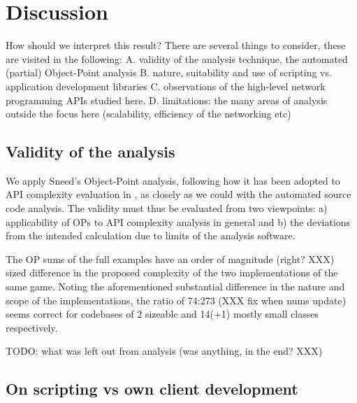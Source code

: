 \documentclass[conference]{IEEEtran}
\begin{document}
\section{Discussion%
  \label{discussion}%
}

How should we interpret this result? There are several things to
consider, these are visited in the following: A. validity of the
analysis technique, the automated (partial) Object-Point
analysis B. nature, suitability and use of scripting vs. application
development libraries C. observations of the high-level network
programming APIs studied here. D. limitations: the many areas of
analysis outside the focus here (scalability, efficiency of the
networking etc)


\subsection{Validity of the analysis%
  \label{validity-of-the-analysis}%
}

We apply Sneed's Object-Point analysis, following how it has been
adopted to API complexity evaluation in \cite{api-complexity-analysis}, as
closely as we could with the automated source code analysis. The
validity must thus be evaluated from two viewpoints: a) applicability
of OPs to API complexity analysis in general and b) the deviations
from the intended calculation due to limits of the analysis software.

The OP sums of the full examples have an order of magnitude
(right? XXX) sized difference in the proposed complexity of the two
implementations of the same game. Noting the aforementioned
substantial difference in the nature and scope of the implementations,
the ratio of 74:273 (XXX fix when nums update) seems correct for
codebases of 2 sizeable and 14(+1) mostly small classes respectively.

TODO: what was left out from analysis (was anything, in the end? XXX)


\subsection{On scripting vs own client development%
  \label{on-scripting-vs-own-client-development}%
}
\end{document}
